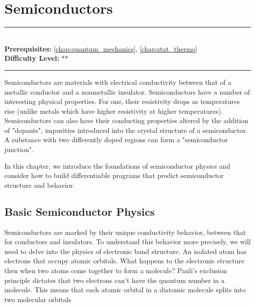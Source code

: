 \documentclass[book.tex]{subfiles}
\begin{document}
\chapter{Semiconductors}

\label{chap:semiconductors}
\noindent\rule{11cm}{0.4pt} \\
\textbf{Prerequisites:} \autoref{chap:quantum_mechanics}, \autoref{chap:stat_thermo} \\
\textbf{Difficulty Level:} ** \\
\noindent\rule{11cm}{0.4pt}
\vspace{5mm}

Semiconductors are materials with electrical conductivity between that of a metallic conductor and a nonmetallic insulator. Semiconductors have a number of interesting physical properties. For one, their resistivity drops as temperatures rise (unlike metals which have higher resistivity at higher temperatures). Semiconductors can also have their conducting properties altered by the addition of "dopants", impurities introduced into the crystal structure of a semiconductor. A substance with two differently doped regions can form a "semiconductor junction".

In this chapter, we introduce the foundations of semiconductor physics and consider how to build differentiable programs that predict semiconductor structure and behavior. %

\section{Basic Semiconductor Physics}

Semiconductors are marked by their unique conductivity behavior, between that for conductors and insulators. To understand this behavior more precisely, we will need to delve into the physics of electronic band structure. An isolated atom has electrons that occupy atomic orbitals. 
What happens to the electronic structure then when two atoms come together to form a molecule? Pauli's exclusion principle dictates that two electrons can't have the quantum number in a molecule. This means that each atomic orbital in a diatomic molecule splits into two molecular orbitals %
\end{document}
